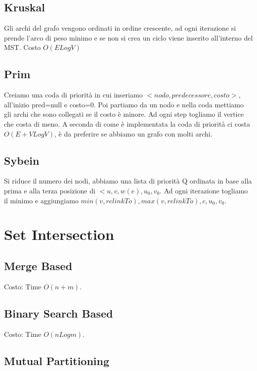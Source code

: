 \documentclass[12pt]{article}
\begin{document}
\subsection{Kruskal}

Gli archi del grafo vengono ordinati in ordine crescente, ad ogni iterazione si prende l'arco di peso minimo e se non si crea un ciclo viene inserito all'interno del MST. Costo $O(ELogV)$


\subsection{Prim}

Creiamo una coda di priorità in cui inseriamo $<nodo, predecessore, costo>$, all'inizio pred=null e costo=0.
Poi partiamo da un nodo e nella coda mettiamo gli archi che sono collegati se il costo è minore.
Ad ogni step togliamo il vertice che costa di meno.
A seconda di come è implementata la coda di priorità ci costa $O(E+VLogV)$, è da preferire se abbiamo un grafo con molti archi.

\subsection{Sybein}

Si riduce il numero dei nodi, abbiamo una lista di priorità Q ordinata in base alla prima e alla terza posizione di $<u,v,w(e),u_0,v_0$.
Ad ogni iterazione togliamo il minimo e aggiungiamo $min(v,relinkTo),max(v,relinkTo),c,u_0,v_0$.

\section{Set Intersection}

\subsection{Merge Based}

Costo: Time $O(n+m)$.

\subsection{Binary Search Based}

Costo: Time $O(nLogm)$.

\subsection{Mutual Partitioning}
\end{document}
